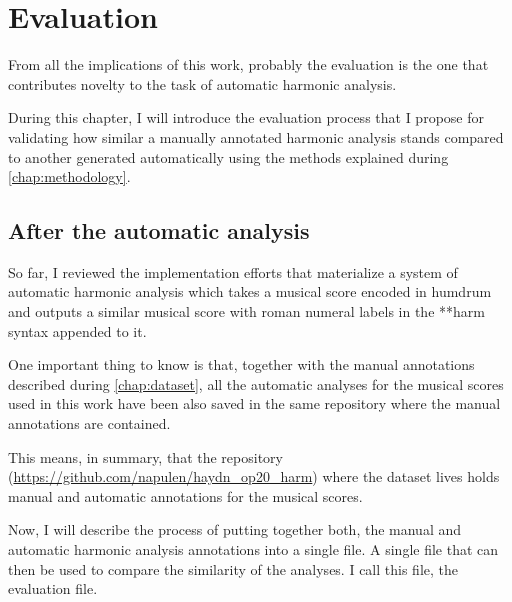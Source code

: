 \chapter{Evaluation}
\label{chap:evaluation}
From all the implications of this work, probably the evaluation is the one that contributes novelty to the task of automatic harmonic analysis.


During this chapter, I will introduce the evaluation process that I propose for validating how similar a manually annotated harmonic analysis stands compared to another generated automatically using the methods explained during \autoref{chap:methodology}.

\section{After the automatic analysis}
So far, I reviewed the implementation efforts that materialize a system of automatic harmonic analysis which takes a musical score encoded in humdrum and outputs a similar musical score with roman numeral labels in the **harm syntax appended to it.

One important thing to know is that, together with the manual annotations described during \autoref{chap:dataset}, all the automatic analyses for the musical scores used in this work have been also saved in the same repository where the manual annotations are contained.

This means, in summary, that the repository (\url{https://github.com/napulen/haydn_op20_harm}) where the dataset lives holds manual and automatic annotations for the musical scores.

Now, I will describe the process of putting together both, the manual and automatic harmonic analysis annotations into a single file. A single file that can then be used to compare the similarity of the analyses. I call this file, the evaluation file.

